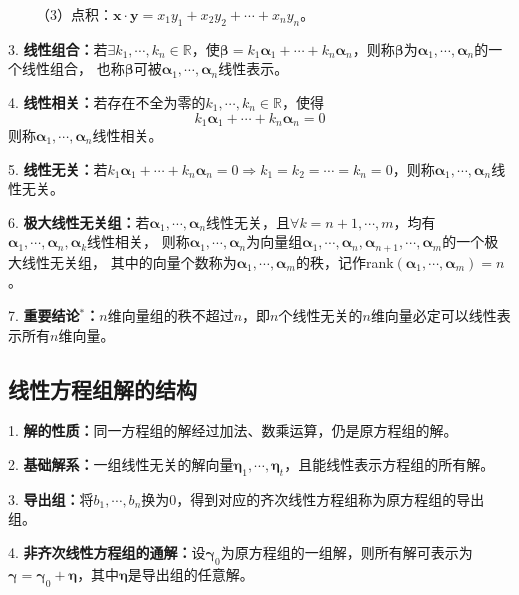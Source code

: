 ~~~~（3）点积：$\boldsymbol{x}\cdot \boldsymbol{y}=x_1y_1+x_2y_2+\cdots+x_ny_n$。

3. \textbf{线性组合：}若$\exists k_1,\cdots,k_n\in \mathbb{R}$，使$\boldsymbol{\beta} = k_1\boldsymbol{\alpha}_1+\cdots+k_n\boldsymbol{\alpha}_n$，则称$\boldsymbol{\beta}$为$\boldsymbol{\alpha}_1,\cdots,\boldsymbol{\alpha}_n$的一个线性组合，
也称$\boldsymbol{\beta}$可被$\boldsymbol{\alpha}_1,\cdots,\boldsymbol{\alpha}_n$线性表示。

4. \textbf{线性相关：}若存在不全为零的$k_1,\cdots,k_n\in \mathbb{R}$，使得
\begin{equation*}
    k_1\boldsymbol{\alpha}_1+\cdots+k_n\boldsymbol{\alpha}_n=0
\end{equation*}
则称$\boldsymbol{\alpha}_1,\cdots,\boldsymbol{\alpha}_n$线性相关。

5. \textbf{线性无关：}若$k_1\boldsymbol{\alpha}_1+\cdots+k_n\boldsymbol{\alpha}_n=0\Rightarrow k_1=k_2=\cdots=k_n=0$，则称$\boldsymbol{\alpha}_1,\cdots,\boldsymbol{\alpha}_n$线性无关。

6. \textbf{极大线性无关组：}若$\boldsymbol{\alpha}_1,\cdots,\boldsymbol{\alpha}_n$线性无关，且$\forall k = n+1,\cdots,m$，均有$\boldsymbol{\alpha}_1,\cdots,\boldsymbol{\alpha}_n,\boldsymbol{\alpha}_k$线性相关，
则称$\boldsymbol{\alpha}_1,\cdots,\boldsymbol{\alpha}_n$为向量组$\boldsymbol{\alpha}_1,\cdots,\boldsymbol{\alpha}_n,\boldsymbol{\alpha}_{n+1},\cdots,\boldsymbol{\alpha}_m$的一个极大线性无关组，
其中的向量个数称为$\boldsymbol{\alpha}_1,\cdots,\boldsymbol{\alpha}_m$的秩，记作rank$(\boldsymbol{\alpha}_1,\cdots,\boldsymbol{\alpha}_m)=n$。

7. \textbf{重要结论$^*$：}$n$维向量组的秩不超过$n$，即$n$个线性无关的$n$维向量必定可以线性表示所有$n$维向量。

\subsection{线性方程组解的结构}

1. \textbf{解的性质：}同一方程组的解经过加法、数乘运算，仍是原方程组的解。

2. \textbf{基础解系：}一组线性无关的解向量$\boldsymbol{\eta}_1,\cdots,\boldsymbol{\eta}_t$，且能线性表示方程组的所有解。

3. \textbf{导出组：}将$b_1,\cdots,b_n$换为$0$，得到对应的齐次线性方程组称为原方程组的导出组。

4. \textbf{非齐次线性方程组的通解：}设$\boldsymbol{\gamma}_0$为原方程组的一组解，则所有解可表示为$\boldsymbol{\gamma}=\boldsymbol{\gamma}_0+\boldsymbol{\eta}$，其中$\boldsymbol{\eta}$是导出组的任意解。

